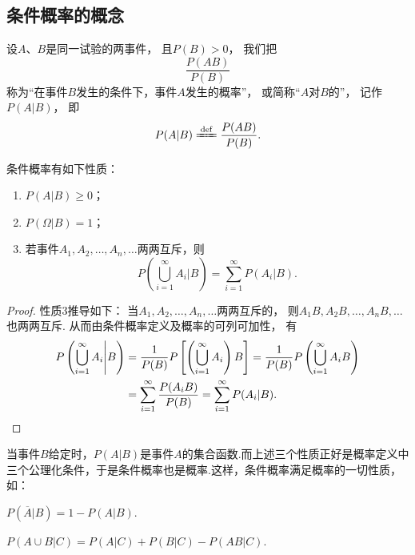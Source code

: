 \subsection{条件概率的概念}
\begin{definition}
设\(A\)、\(B\)是同一试验的两事件，
且\(P(B) > 0\)，
我们把\[
	\frac{P(AB)}{P(B)}
\]称为“在事件\(B\)发生的条件下，事件\(A\)发生的概率”，
或简称“\(A\)对\(B\)的”，
记作\(P(A \vert B)\)，
即\begin{equation}
	P(A \vert B)
	\defeq
	\frac{P(AB)}{P(B)}.
\end{equation}
\end{definition}

\begin{property}
条件概率有如下性质：\begin{enumerate}
	\item \(P(A \vert B) \geq 0\)；
	\item \(P(\Omega \vert B) = 1\)；
	\item 若事件\(A_1,A_2,\dotsc,A_n,\dotsc\)两两互斥，则\[
		P\left(\bigcup_{i=1}^\infty {A_i} \Bigg\vert B\right)
		= \sum\limits_{i=1}^\infty {P(A_i \vert B)}.
	\]
\end{enumerate}
\begin{proof}
性质3推导如下：
当\(A_1,A_2,\dotsc,A_n,\dotsc\)两两互斥的，
则\(A_1 B,A_2 B,\dotsc,A_n B,\dotsc\)也两两互斥.
从而由条件概率定义及概率的可列可加性，
有\begin{align*}
	P\left(\bigcup_{i=1}^\infty {A_i} \Bigg\vert B\right)
	&= \frac{1}{P(B)} P\left[\left(\displaystyle\bigcup_{i=1}^\infty {A_i}\right) B\right]
	= \frac{1}{P(B)} P\left(\displaystyle\bigcup_{i=1}^\infty {A_i B}\right) \\
	&= \sum\limits_{i=1}^\infty {\frac{P(A_i B)}{P(B)}}
	= \sum\limits_{i=1}^\infty {P(A_i \vert B)}.
	\qedhere
\end{align*}
\end{proof}
\end{property}

当事件\(B\)给定时，\(P(A \vert B)\)是事件\(A\)的集合函数.而上述三个性质正好是概率定义中三个公理化条件，于是条件概率也是概率.这样，条件概率满足概率的一切性质，如：

\begin{property}
\(P(\overline{A} \vert B) = 1 - P(A \vert B)\).
\end{property}

\begin{property}
\(P(A \cup B \vert C) = P(A \vert C) + P(B \vert C) - P(AB \vert C)\).
\end{property}

